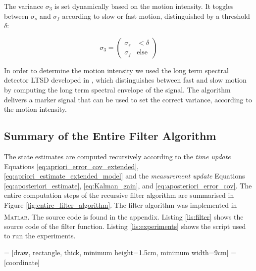 \noindent
The variance $\sigma_3$ is set dynamically based on the motion intensity. It toggles between $\sigma_s$ and $\sigma_f$ according to slow or fast motion, distinguished by a threshold $\delta$:

\begin{equation}
  \sigma_3 = \begin{pmatrix}
  	\sigma_s & < \delta\\
  	\sigma_f & \mbox{else}
  \end{pmatrix}
\end{equation}

\noindent
In order to determine the motion intensity we used the long term spectral detector \gls{LTSD} developed in \cite{olivares_vicente_gaitwatch_2013}, which distinguishes between fast and slow motion by computing the long term spectral envelope of the signal. The algorithm delivers a marker signal that can be used to set the correct variance, according to the motion intensity.

\subsection{Summary of the Entire Filter Algorithm}

The state estimates are computed recursively according to the \emph{time update} Equations \ref{eq:apriori_error_cov_extended}, \ref{eq:apriori_estimate_extended_model} and the \emph{measurement update} Equations \ref{eq:aposteriori_estimate}, \ref{eq:Kalman_gain}, and \ref{eq:aposteriori_error_cov}. The entire computation steps of the recursive filter algorithm are summarised in Figure \ref{fig:entire_filter_algorithm}. The filter algorithm was implemented in \textsc{Matlab}\textsuperscript{\textregistered}. The source code is found in the appendix. Listing \ref{lis:filter} shows the source code of the filter function. Listing \ref{lis:experiments} shows the script used to run the experiments.


 = [draw, rectangle, thick, 
    minimum height=1.5cm, minimum width=9cm]
 = [coordinate]

